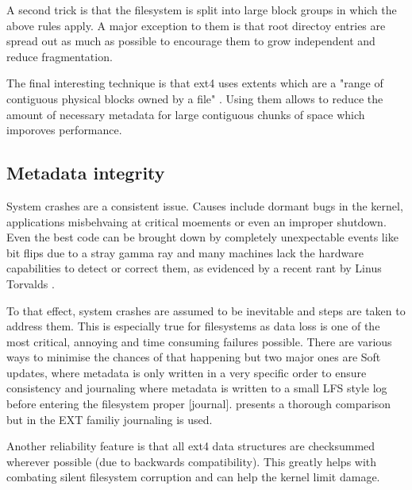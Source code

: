             A second trick is that the filesystem is split into large block
            groups in which the above rules apply. A major exception to them is
            that root directoy entries are spread out as much as possible to
            encourage them to grow independent and reduce fragmentation.

            The final interesting technique is that ext4 uses extents which are
            a "range of contiguous physical blocks owned by a file"
            \cite{ext4_space_maps}. Using them allows to reduce the amount of
            necessary metadata for large contiguous chunks of space which
            imporoves performance.

        \subsection{Metadata integrity}

            System crashes are a consistent issue. Causes include dormant bugs
            in the kernel, applications misbehvaing at critical moements or
            even an improper shutdown. Even the best code can be brought down
            by completely unexpectable events like bit flips due to a stray
            gamma ray and many machines lack the hardware capabilities to
            detect or correct them, as evidenced by a recent rant by Linus
            Torvalds \cite{Linus_ECC_rant}.

            To that effect, system crashes are assumed to be inevitable and
            steps are taken to address them. This is especially true for
            filesystems as data loss is one of the most critical, annoying and
            time consuming failures possible. There are various ways to
            minimise the chances of that happening but two major ones are Soft
            updates, where metadata is only written in a very specific order to
            ensure consistency \cite{soft_updates} and journaling where
            metadata is written to a small LFS style log before entering the
            filesystem proper \cite{ext4_docs}[journal].
            \citeauthor{journaling_vs_soft_updates} presents a thorough
            comparison but in the EXT familiy journaling is used.

            Another reliability feature is that all ext4 data structures are
            checksummed wherever possible (due to backwards compatibility).
            This greatly helps with combating silent filesystem corruption and
            can help the kernel limit damage.

